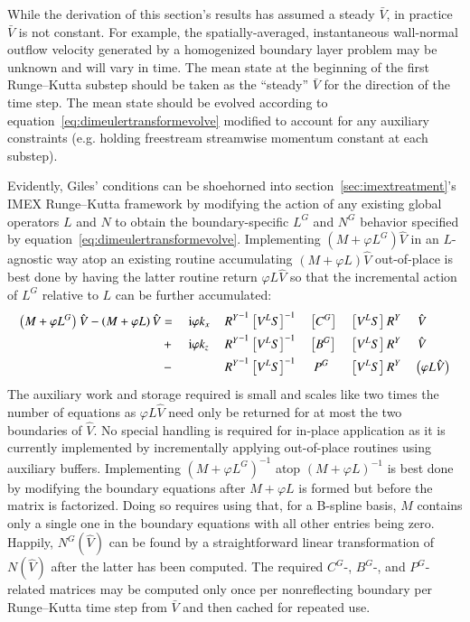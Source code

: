 \documentclass[letterpaper,11pt,nointlimits,reqno,draft]{amsart}
\newcommand{\ii}{\ensuremath{\mathrm{i}}}
\begin{document}
While the derivation of this section's results has assumed a steady $\bar{V}$,
in practice $\bar{V}$ is not constant.  For example, the spatially-averaged,
instantaneous wall-normal outflow velocity generated by a homogenized boundary
layer problem may be unknown and will vary in time.  The mean state at the
beginning of the first Runge--Kutta substep should be taken as the ``steady''
$\bar{V}$ for the direction of the time step.  The mean state should be evolved
according to equation~\eqref{eq:dimeulertransformevolve} modified to account
for any auxiliary constraints (e.g. holding freestream streamwise momentum
constant at each substep).

Evidently, Giles' conditions can be shoehorned into
section~\ref{sec:imextreatment}'s IMEX Runge--Kutta framework by modifying the
action of any existing global operators $L$ and $N$ to obtain the
boundary-specific $L^G$ and $N^G$ behavior specified by
equation~\eqref{eq:dimeulertransformevolve}.  Implementing
$\left(M+\varphi{}L^G\right)\hat{V}$ in an $L$-agnostic way atop an existing
routine accumulating $\left(M+\varphi{}L\right)\hat{V}$ out-of-place is best
done by having the latter routine return $\varphi{}L\hat{V}$ so that the
incremental action of $L^G$ relative to $L$ can be further accumulated:
\begin{alignat}{10}
\left(M+\varphi{}L^G\right)\hat{V} - \left(M+\varphi{}L\right)\hat{V}
  &={}   &&\ii \varphi{} k_x \, &&{R^Y}^{-1} \left[V^L S\right]^{-1} &&\left[C^G\right]                    &&\left[V^L S\right] {R^Y} &&\,\,\hat{V} \\
  &{}+{} &&\ii \varphi{} k_z    &&{R^Y}^{-1} \left[V^L S\right]^{-1} &&\left[B^G\right]                    &&\left[V^L S\right] {R^Y} &&\,\,\hat{V} \\
  &{}-{} &&                     &&{R^Y}^{-1} \left[V^L S\right]^{-1} &&\phantom{\Bigl[}P^G\phantom{\Bigr]} &&\left[V^L S\right] {R^Y} &&\left(\varphi{}L\hat{V}\right)
\end{alignat}
The auxiliary work and storage required is small and scales like two times the
number of equations as $\varphi{}L\hat{V}$ need only be returned for at most
the two boundaries of $\hat{V}$.  No special handling is required for in-place
application as it is currently implemented by incrementally applying
out-of-place routines using auxiliary buffers.  Implementing
$\left(M+\varphi{}L^G\right)^{-1}$ atop $\left(M+\varphi{}L\right)^{-1}$ is
best done by modifying the boundary equations after $M+\varphi{}L$ is formed
but before the matrix is factorized.  Doing so requires using that, for a
B-spline basis, $M$ contains only a single one in the boundary equations with
all other entries being zero.  Happily, $N^G(\hat{V})$ can be found by a
straightforward linear transformation of $N(\hat{V})$ after the latter has been
computed.  The required $C^G$-, $B^G$-, and $P^G$-related matrices may be
computed only once per nonreflecting boundary per Runge--Kutta time step from
$\bar{V}$ and then cached for repeated use.
\end{document}
